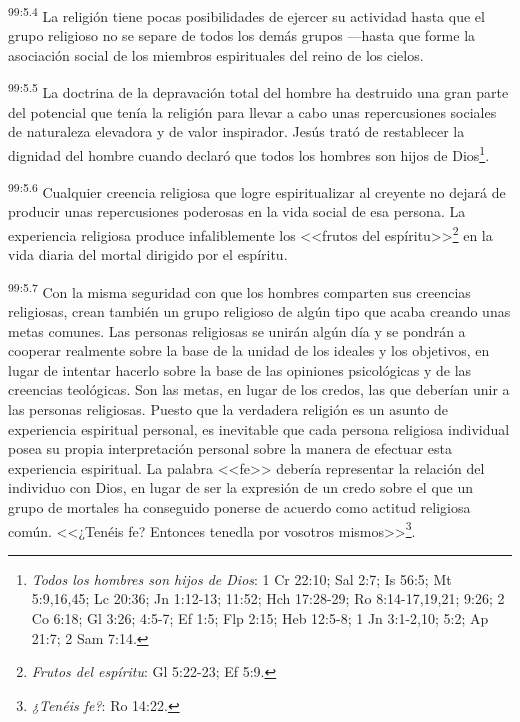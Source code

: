 \par
\textsuperscript{99:5.4} La religión tiene pocas posibilidades de ejercer su actividad hasta que el grupo religioso no se separe de todos los demás grupos ---hasta que forme la asociación social de los miembros espirituales del reino de los cielos.

\par
\textsuperscript{99:5.5} La doctrina de la depravación total del hombre ha destruido una gran parte del potencial que tenía la religión para llevar a cabo unas repercusiones sociales de naturaleza elevadora y de valor inspirador. Jesús trató de restablecer la dignidad del hombre cuando declaró que todos los hombres son hijos de Dios\footnote{\textit{Todos los hombres son hijos de Dios}: 1 Cr 22:10; Sal 2:7; Is 56:5; Mt 5:9,16,45; Lc 20:36; Jn 1:12-13; 11:52; Hch 17:28-29; Ro 8:14-17,19,21; 9:26; 2 Co 6:18; Gl 3:26; 4:5-7; Ef 1:5; Flp 2:15; Heb 12:5-8; 1 Jn 3:1-2,10; 5:2; Ap 21:7; 2 Sam 7:14.}.

\par
\textsuperscript{99:5.6} Cualquier creencia religiosa que logre espiritualizar al creyente no dejará de producir unas repercusiones poderosas en la vida social de esa persona. La experiencia religiosa produce infaliblemente los <<frutos del espíritu>>\footnote{\textit{Frutos del espíritu}: Gl 5:22-23; Ef 5:9.} en la vida diaria del mortal dirigido por el espíritu.

\par
\textsuperscript{99:5.7} Con la misma seguridad con que los hombres comparten sus creencias religiosas, crean también un grupo religioso de algún tipo que acaba creando unas metas comunes. Las personas religiosas se unirán algún día y se pondrán a cooperar realmente sobre la base de la unidad de los ideales y los objetivos, en lugar de intentar hacerlo sobre la base de las opiniones psicológicas y de las creencias teológicas. Son las metas, en lugar de los credos, las que deberían unir a las personas religiosas. Puesto que la verdadera religión es un asunto de experiencia espiritual personal, es inevitable que cada persona religiosa individual posea su propia interpretación personal sobre la manera de efectuar esta experiencia espiritual. La palabra <<fe>> debería representar la relación del individuo con Dios, en lugar de ser la expresión de un credo sobre el que un grupo de mortales ha conseguido ponerse de acuerdo como actitud religiosa común. <<¿Tenéis fe? Entonces tenedla por vosotros mismos>>\footnote{\textit{¿Tenéis fe?}: Ro 14:22.}.

